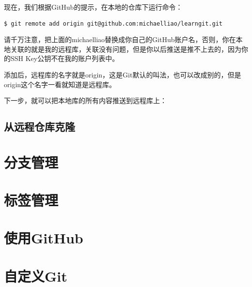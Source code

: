 \documentclass[•]{article}
\begin{document}
\begin{CJK}{UTF8}{gbsn}
\qquad 现在，我们根据GitHub的提示，在本地的\fbox{\color{red}{learngit}}仓库下运行命令：
\begin{lstlisting} 
$ git remote add origin git@github.com:michaelliao/learngit.git
\end{lstlisting}

请千万注意，把上面的michaelliao替换成你自己的GitHub账户名，否则，你在本地关联的就是我的远程库，关联没有问题，但是你以后推送是推不上去的，因为你的SSH Key公钥不在我的账户列表中。

添加后，远程库的名字就是origin，这是Git默认的叫法，也可以改成别的，但是origin这个名字一看就知道是远程库。

下一步，就可以把本地库的所有内容推送到远程库上：

\subsection{从远程仓库克隆}
\section{分支管理}
\section{标签管理}
\section{使用GitHub}
\section{自定义Git}
\end{CJK}
\end{document}
